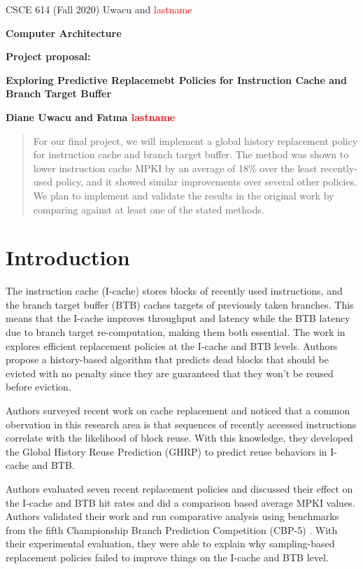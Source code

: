 \documentclass[11pt]{article}
\begin{document}
\centerline{CSCE 614 (Fall 2020) \hfill Uwacu and \textcolor{red}{lastname}}
\medskip
\centerline{\bf Computer Architecture}
\medskip

\centerline{\bf  Project proposal: }

\bigskip

\centerline{\bf Exploring Predictive Replacemebt Policies for Instruction Cache and Branch Target Buffer}

\bigskip

\centerline{\bf Diane Uwacu and Fatma \textcolor{red}{lastname}}

\bigskip

\begin{abstract}
	For our final project, we will implement a global history replacement policy for instruction cache and branch target buffer.
	The method was shown to lower instruction cache MPKI by an average of 18\% over the least recently-used policy, and it showed
	similar improvements over several other policies.
	We plan to implement and validate the results in the original work by comparing against at least one of the stated methods.
\end{abstract}

\section{Introduction} 
\label{sec:introduction}

The instruction cache (I-cache) stores blocks of recently used instructions, and the branch target buffer (BTB) caches targets of previously taken branches. 
This means that the I-cache improves throughput and latency while the BTB latency due to branch target re-computation, making them both essential.
The work in \cite{samira-ISCA18} explores efficient replacement policies at the I-cache and BTB levels. Authors propose a history-based algorithm that predicts
dead blocks that should be evicted with no penalty since they are guaranteed that they won't be reused before eviction.

Authors surveyed recent work on cache replacement and noticed that a common obervation in this research area is that sequences of recently accessed instructions
correlate with the likelihood of block reuse. With this knowledge, they developed the Global History Reuse Prediction (GHRP) to predict reuse behaviors in I-cache and BTB.

Authors evaluated seven recent replacement policies and discussed their effect on the I-cache and BTB hit rates and did a comparison based average MPKI values.
Authors validated their work and run comparative analysis using benchmarks from the fifth Championship Branch Prediction Competition (CBP-5) \cite{cbp-5}.
With their experimental evaluation, they were able to explain why sampling-based replacement policies failed to improve things on the I-cache and BTB level.
\end{document}
